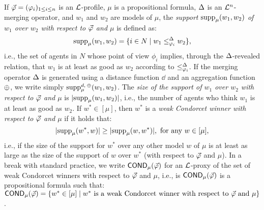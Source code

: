 If $\P=(\phi_i)_{1\le i \le n}$ is an $\L$-profile,
$\mu$ is a propositional formula,
$\me$ is an $\L^{n}$-merging operator,
and $w_1$ and $w_2$ are models of $\mu$,
the \emph{support $\supp_\mu(w_1,w_2)$ of $w_1$ over $w_2$ with respect to $\P$ and $\mu$} is 
defined as:
$$
	\supp_{\mu}(w_1,w_2)=\{i\in N\mid w_1\le^\me_{\phi_i} w_2\},
$$
i.e.,
the set of agents in $N$ whose point of view $\phi_{i}$ implies,
through the $\me$-revealed relation,
that $w_1$ is at least as good as $w_2$ according to $\le^\me_{\phi_i}$.
If the merging operator $\me$ is generated using a distance function $\dd$ and 
an aggregation function $\agg$, we write simply $\supp^{\dd,\:\agg}_{\mu}(w_1,w_2)$.
The \emph{size of the support of $w_1$ over $w_2$ with respect to $\P$ and $\mu$} 
is $|\supp_{\mu}(w_1,w_2)|$,
i.e., the number of agents who think $w_1$ is at least as good as $w_2$.
If $w^{\ast}\in[\mu]$,
then $w^{\ast}$ is a \emph{weak Condorcet winner with respect to $\P$ and $\mu$} if
it holds that:
	$$
		|\supp_{\mu}(w^{\ast},w)|\ge |\supp_{\mu}(w,w^{\ast})|,~\text{for any}~w\in[\mu],
	$$
i.e., if the size of the support for $w^{\ast}$ over any other model $w$ of $\mu$
is at least as large
as the size of the support of $w$ over $w^{\ast}$ (with respect to $\P$ and $\mu$).
In a break with standard practice,
we write $\COND_{\mu}(\P)$ for an $\L$-proxy of the 
set of weak Condorcet winners with respect to $\P$ and $\mu$,
i.e., is $\COND_\mu(\P)$ is a propositional formula such that:
$
	\COND_\mu(\P)
	=
	\{w^{\ast}\in[\mu]\mid w^{\ast}~\text{is a weak Condorcet winner with respect to}~\P~\text{and}~\mu\}
$.

